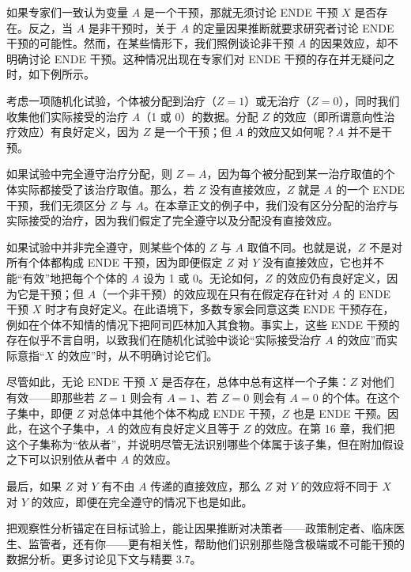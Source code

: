 \renewcommand{\FPname}{精要（Fine Point）}
\begin{finepoint}[非干预的因果推断何时不受质疑]
如果专家们一致认为变量 $A$ 是一个干预，那就无须讨论 ENDE 干预 $X$ 是否存在。反之，当 $A$ 是非干预时，关于 $A$ 的定量因果推断就要求研究者讨论 ENDE 干预的可能性。然而，在某些情形下，我们照例谈论非干预 $A$ 的因果效应，却不明确讨论 ENDE 干预。这种情况出现在专家们对 ENDE 干预的存在并无疑问之时，如下例所示。

考虑一项随机化试验，个体被分配到治疗（$Z=1$）或无治疗（$Z=0$），同时我们收集他们实际接受的治疗 $A$（1 或 0）的数据。分配 $Z$ 的效应（即所谓意向性治疗效应）有良好定义，因为 $Z$ 是一个干预；但 $A$ 的效应又如何呢？$A$ 并不是干预。

如果试验中完全遵守治疗分配，则 $Z=A$，因为每个被分配到某一治疗取值的个体实际都接受了该治疗取值。那么，若 $Z$ 没有直接效应，$Z$ 就是 $A$ 的一个 ENDE 干预，我们无须区分 $Z$ 与 $A$。在本章正文的例子中，我们没有区分分配的治疗与实际接受的治疗，因为我们假定了完全遵守以及分配没有直接效应。

如果试验中并非完全遵守，则某些个体的 $Z$ 与 $A$ 取值不同。也就是说，$Z$ 不是对所有个体都构成 ENDE 干预，因为即便假定 $Z$ 对 $Y$ 没有直接效应，它也并不能“有效”地把每个个体的 $A$ 设为 1 或 0。无论如何，$Z$ 的效应仍有良好定义，因为它是干预；但 $A$（一个非干预）的效应现在只有在假定存在针对 $A$ 的 ENDE 干预 $X$ 时才有良好定义。在此语境下，多数专家会同意这类 ENDE 干预存在，例如在个体不知情的情况下把阿司匹林加入其食物。事实上，这些 ENDE 干预的存在似乎不言自明，以致我们在随机化试验中谈论“实际接受治疗 $A$ 的效应”而实际意指“$X$ 的效应”时，从不明确讨论它们。

尽管如此，无论 ENDE 干预 $X$ 是否存在，总体中总有这样一个子集：$Z$ 对他们有效——即那些若 $Z=1$ 则会有 $A=1$、若 $Z=0$ 则会有 $A=0$ 的个体。在这个子集中，即便 $Z$ 对总体中其他个体不构成 ENDE 干预，$Z$ 也是 ENDE 干预。因此，在这个子集中，$A$ 的效应有良好定义且等于 $Z$ 的效应。在第 16 章，我们把这个子集称为“依从者”，并说明尽管无法识别哪些个体属于该子集，但在附加假设之下可以识别依从者中 $A$ 的效应。

最后，如果 $Z$ 对 $Y$ 有不由 $A$ 传递的直接效应，那么 $Z$ 对 $Y$ 的效应将不同于 $X$ 对 $Y$ 的效应，即便在完全遵守的情况下也是如此。
\end{finepoint}
\renewcommand{\FPname}{精要}

把观察性分析锚定在目标试验上，能让因果推断对决策者——政策制定者、临床医生、监管者，还有你——更有相关性，帮助他们识别那些隐含极端或不可能干预的数据分析。更多讨论见下文与精要 3.7。

